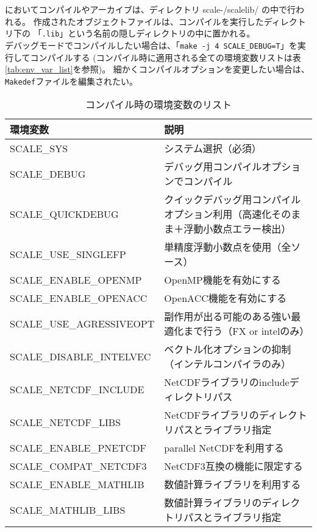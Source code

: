 \scalelib においてコンパイルやアーカイブは、ディレクトリ scale-{\version}/scalelib/ の中で行われる。
作成されたオブジェクトファイルは、コンパイルを実行したディレクトリ下の
「\verb|.lib|」という名前の隠しディレクトリの中に置かれる。\\

 デバッグモードでコンパイルしたい場合は、「\verb|make -j 4 SCALE_DEBUG=T|」を実行してコンパイルする
 (コンパイル時に適用される全ての環境変数リストは表\ref{tab:env_var_list}を参照)。
細かくコンパイルオプションを変更したい場合は、\verb|Makedef|ファイルを編集されたい。

\begin{table}[htb]
\begin{center}
\caption{コンパイル時の環境変数のリスト}
\begin{tabularx}{150mm}{|l|X|} \hline
 \rowcolor[gray]{0.9} 環境変数 & 説明  \\ \hline
 SCALE\_SYS               & システム選択（必須）  \\ \hline
 SCALE\_DEBUG             & デバッグ用コンパイルオプションでコンパイル  \\ \hline
 SCALE\_QUICKDEBUG        & クイックデバッグ用コンパイルオプション利用（高速化そのまま＋浮動小数点エラー検出）  \\ \hline
 SCALE\_USE\_SINGLEFP     & 単精度浮動小数点を使用（全ソース）  \\ \hline
 SCALE\_ENABLE\_OPENMP    & OpenMP機能を有効にする  \\ \hline
 SCALE\_ENABLE\_OPENACC   & OpenACC機能を有効にする  \\ \hline
 SCALE\_USE\_AGRESSIVEOPT & 副作用が出る可能のある強い最適化まで行う（FX or intelのみ）  \\ \hline
 SCALE\_DISABLE\_INTELVEC & ベクトル化オプションの抑制（インテルコンパイラのみ）  \\ \hline
 SCALE\_NETCDF\_INCLUDE   & NetCDFライブラリのincludeディレクトリパス  \\ \hline
 SCALE\_NETCDF\_LIBS      & NetCDFライブラリのディレクトリパスとライブラリ指定  \\ \hline
 SCALE\_ENABLE\_PNETCDF   & parallel NetCDFを利用する  \\ \hline
 SCALE\_COMPAT\_NETCDF3   & NetCDF3互換の機能に限定する  \\ \hline
 SCALE\_ENABLE\_MATHLIB   & 数値計算ライブラリを利用する  \\ \hline
 SCALE\_MATHLIB\_LIBS     & 数値計算ライブラリのディレクトリパスとライブラリ指定  \\ \hline

\end{tabularx}
\end{center}
\end{table}
